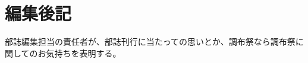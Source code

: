 \documentclass[../super_nova_20yy]{subfiles}
\begin{document}
\chapter{編集後記}
\vspace{2\zw}
部誌編集担当の責任者が、部誌刊行に当たっての思いとか、調布祭なら調布祭に関してのお気持ちを表明する。

\end{document}
